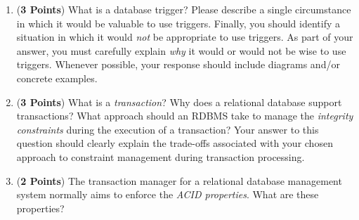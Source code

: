 \documentclass[12pt]{article}
\begin{document}
\begin{enumerate}
\begin{enumerate}


    \item ({\bf 3 Points}) What is a database trigger?  Please
      describe a single circumstance in which it would be valuable to
      use triggers.  Finally, you should identify a situation in which
      it would {\em not} be appropriate to use triggers.  As part of
      your answer, you must carefully explain {\em why} it would or
      would not be wise to use triggers.  Whenever possible, your
      response should include diagrams and/or concrete examples.


    \item ({\bf 3 Points}) What is a {\em transaction}?  Why does a
      relational database support transactions?  What approach should
      an RDBMS take to manage the {\em integrity constraints} during
      the execution of a transaction?  Your answer to this question
      should clearly explain the trade-offs associated with your
      chosen approach to constraint management during transaction
      processing.

    \item ({\bf 2 Points}) The transaction manager for a relational
      database management system normally aims to enforce the {\em
        ACID properties}.  What are these properties?

    \end{enumerate}
      

\end{enumerate}
\end{document}
